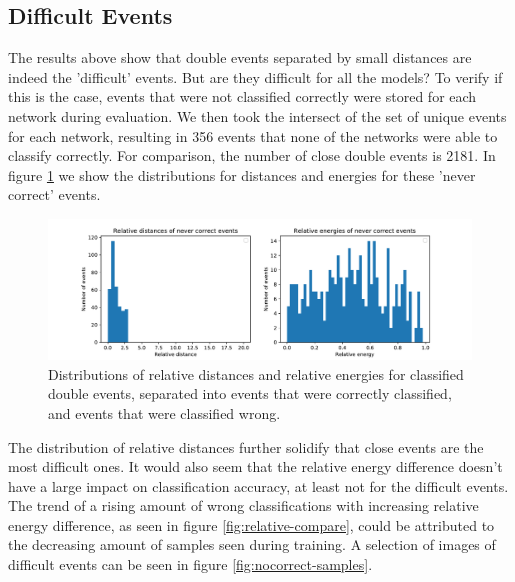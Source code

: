 \documentclass[12pt, notitlepage]{article}
\begin{document}
\subsection{Difficult Events}
The results above show that double events separated by small distances are indeed the 'difficult' events.
But are they difficult for all the models? To verify if this is the case, events that were not classified
correctly were stored for each network during evaluation. We then took the intersect of the set of unique
events for each network, resulting in 356 events that none of the networks were able to classify correctly.
For comparison, the number of close double events is 2181. In figure \ref{fig:relative-noncorrect} we show
the distributions for distances and energies for these 'never correct' events.
\begin{figure}
    \includegraphics[width=\textwidth]{figures/DenseNet201_relative_noncorrect}
    \caption{Distributions of relative distances and relative energies for classified double events,
    separated into events that were correctly classified, and events that were classified wrong.}
    \label{fig:relative-noncorrect}
\end{figure}
The distribution of relative distances further solidify that close events are the most difficult ones.
It would also seem that the relative energy difference doesn't have a large impact on classification
accuracy, at least not for the difficult events. The trend of a rising amount of wrong classifications with
increasing relative energy difference, as seen in figure \ref{fig:relative-compare}, could be attributed
to the decreasing amount of samples seen during training. A selection of images of difficult events
can be seen in figure \ref{fig:nocorrect-samples}.
\end{document}
